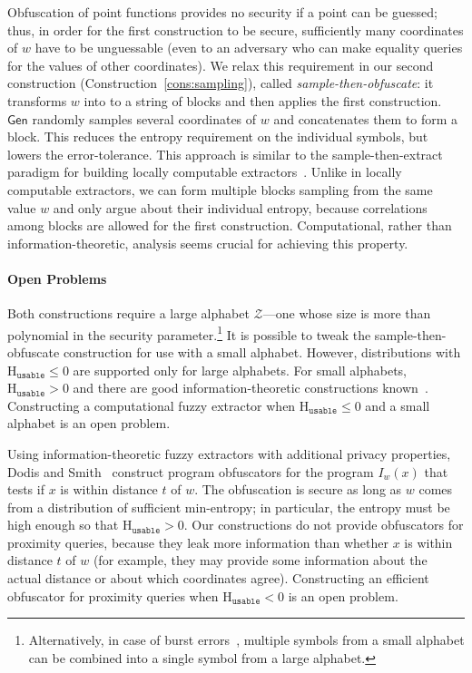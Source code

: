 \documentclass[11pt]{article}
\newcommand{\consref}[1]{\mbox{Construction~\ref{#1}}}
\newcommand{\class}[1]{{\ensuremath{\mathsf{#1}}}}
\newcommand{\gen}{\ensuremath{\class{Gen}}\xspace}
\newcommand{\Huse}{\mathrm{H}_{\mathtt{usable}}}
\begin{document}
Obfuscation of point functions provides no security if a point can be guessed; thus, in order for the first construction to be secure, sufficiently many coordinates of $w$ have to be unguessable (even to an adversary who can make equality queries for the values of other coordinates). We relax this requirement in our second construction (\consref{cons:sampling}), called \emph{sample-then-obfuscate}: it transforms $w$ into to a string of blocks and then applies the first construction. $\gen$ randomly samples several coordinates of $w$ and concatenates them to form a block. This reduces the entropy requirement on the individual symbols, but lowers the error-tolerance. This approach is similar to the sample-then-extract paradigm for building locally computable extractors~\cite{lu2002hyper,vadhan2003constructing}.  Unlike in locally computable extractors, we can form multiple blocks sampling from the same value $w$ and only argue about their individual entropy, because correlations among blocks are allowed for the first construction. Computational, rather than information-theoretic, analysis seems crucial for achieving this property.

\paragraph{Open Problems}
Both constructions require a large alphabet $\mathcal{Z}$---one whose size is more than polynomial in the security parameter.\footnote{Alternatively, in case of burst errors~\cite{gilbert1960capacity}, multiple symbols from a small alphabet can be combined into a single symbol from a large alphabet.}  It is possible to tweak the sample-then-obfuscate construction for use with a small alphabet.  However, distributions with $\Huse \le 0$ are supported only for large alphabets.  For small alphabets, $\Huse>0$ and there are good information-theoretic constructions known~\cite[Section 5]{DBLP:journals/siamcomp/DodisORS08}.
Constructing a computational fuzzy extractor when $\Huse\le 0$ and a small alphabet is an open problem.

Using information-theoretic fuzzy extractors with additional privacy properties, Dodis and Smith~\cite[Section 5]{DBLP:conf/stoc/DodisS05} construct program obfuscators for the program $I_w(x)$ that tests if $x$ is within distance $t$ of $w$. The obfuscation is secure as long as $w$ comes from a distribution of sufficient min-entropy; in particular, the entropy must be high enough so that $\Huse>0$. Our constructions do not provide obfuscators for proximity queries, because they leak more information than whether $x$ is within distance $t$ of $w$ (for example, they may provide some information about the actual distance or about which coordinates agree). Constructing an efficient obfuscator for proximity queries when $\Huse<0$ is an open problem.
\end{document}
